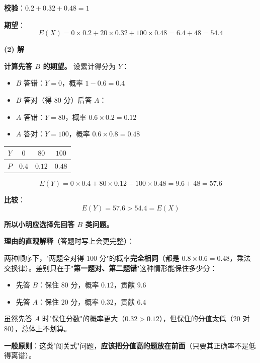 \begin{answer}
\textbf{校验}：$0.2+0.32+0.48=1$ 

\textbf{期望}：
\nopagebreak[4]
\[E(X)=0\times0.2+20\times0.32+100\times0.48=6.4+48=54.4\]

\par\medskip

\textbf{(2) 解}

\textbf{计算先答 $B$ 的期望。} 设累计得分为 $Y$：

\begin{itemize}
\item $B$ 答错：$Y=0$，概率 $1-0.6=0.4$
\item $B$ 答对（得 $80$ 分）后答 $A$：
\item $A$ 答错：$Y=80$，概率 $0.6\times0.2=0.12$
\item $A$ 答对：$Y=100$，概率 $0.6\times0.8=0.48$
\end{itemize}

\begin{center}
\begin{tabular}{cccc}
\toprule
$Y$ & $0$ & $80$ & $100$ \\
\midrule
$P$ & $0.4$ & $0.12$ & $0.48$ \\
\bottomrule
\end{tabular}
\end{center}

\nopagebreak[4]
\[E(Y)=0\times0.4+80\times0.12+100\times0.48=9.6+48=57.6\]

\textbf{比较}：
\nopagebreak[4]
\[E(Y)=57.6>54.4=E(X)\]

\textbf{所以小明应选择先回答 $B$ 类问题。}

\par\medskip

\textbf{理由的直观解释}（答题时写上会更完整）：

两种顺序下，"两题全对得 $100$ 分"的概率\textbf{完全相同}（都是 $0.8\times0.6=0.48$，乘法交换律）。差别只在于"\textbf{第一题对、第二题错}"这种情形能保住多少分：

\begin{itemize}
\item 先答 $B$：保住 $80$ 分，概率 $0.12$，贡献 $9.6$
\item 先答 $A$：保住 $20$ 分，概率 $0.32$，贡献 $6.4$
\end{itemize}

虽然先答 $A$ 时"保住分数"的概率更大（$0.32>0.12$），但保住的分值太低（$20$ 对 $80$），总体上不划算。

\textbf{一般原则}：这类"闯关式"问题，\textbf{应该把分值高的题放在前面}（只要其正确率不是低得离谱）。


\end{answer}
